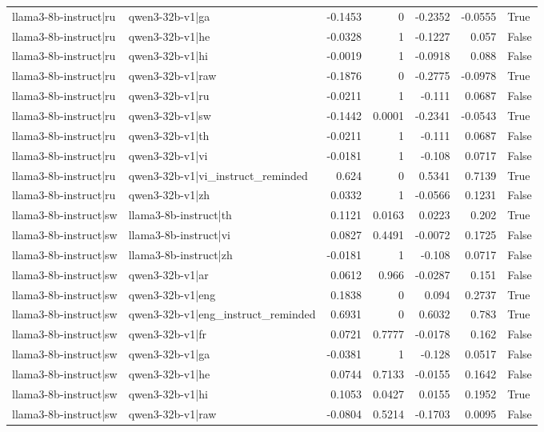\begin{table}
\begin{tabular}{l l r r r r l}
llama3-8b-instruct|ru & qwen3-32b-v1|ga & -0.1453 & 0 & -0.2352 & -0.0555 & True \\
llama3-8b-instruct|ru & qwen3-32b-v1|he & -0.0328 & 1 & -0.1227 & 0.057 & False \\
llama3-8b-instruct|ru & qwen3-32b-v1|hi & -0.0019 & 1 & -0.0918 & 0.088 & False \\
llama3-8b-instruct|ru & qwen3-32b-v1|raw & -0.1876 & 0 & -0.2775 & -0.0978 & True \\
llama3-8b-instruct|ru & qwen3-32b-v1|ru & -0.0211 & 1 & -0.111 & 0.0687 & False \\
llama3-8b-instruct|ru & qwen3-32b-v1|sw & -0.1442 & 0.0001 & -0.2341 & -0.0543 & True \\
llama3-8b-instruct|ru & qwen3-32b-v1|th & -0.0211 & 1 & -0.111 & 0.0687 & False \\
llama3-8b-instruct|ru & qwen3-32b-v1|vi & -0.0181 & 1 & -0.108 & 0.0717 & False \\
llama3-8b-instruct|ru & qwen3-32b-v1|vi_instruct_reminded & 0.624 & 0 & 0.5341 & 0.7139 & True \\
llama3-8b-instruct|ru & qwen3-32b-v1|zh & 0.0332 & 1 & -0.0566 & 0.1231 & False \\
llama3-8b-instruct|sw & llama3-8b-instruct|th & 0.1121 & 0.0163 & 0.0223 & 0.202 & True \\
llama3-8b-instruct|sw & llama3-8b-instruct|vi & 0.0827 & 0.4491 & -0.0072 & 0.1725 & False \\
llama3-8b-instruct|sw & llama3-8b-instruct|zh & -0.0181 & 1 & -0.108 & 0.0717 & False \\
llama3-8b-instruct|sw & qwen3-32b-v1|ar & 0.0612 & 0.966 & -0.0287 & 0.151 & False \\
llama3-8b-instruct|sw & qwen3-32b-v1|eng & 0.1838 & 0 & 0.094 & 0.2737 & True \\
llama3-8b-instruct|sw & qwen3-32b-v1|eng_instruct_reminded & 0.6931 & 0 & 0.6032 & 0.783 & True \\
llama3-8b-instruct|sw & qwen3-32b-v1|fr & 0.0721 & 0.7777 & -0.0178 & 0.162 & False \\
llama3-8b-instruct|sw & qwen3-32b-v1|ga & -0.0381 & 1 & -0.128 & 0.0517 & False \\
llama3-8b-instruct|sw & qwen3-32b-v1|he & 0.0744 & 0.7133 & -0.0155 & 0.1642 & False \\
llama3-8b-instruct|sw & qwen3-32b-v1|hi & 0.1053 & 0.0427 & 0.0155 & 0.1952 & True \\
llama3-8b-instruct|sw & qwen3-32b-v1|raw & -0.0804 & 0.5214 & -0.1703 & 0.0095 & False \\

\end{tabular}
\end{table}
